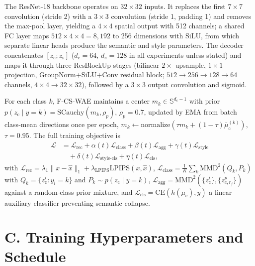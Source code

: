 \documentclass[letterpaper]{article}
\newcommand{\ours}{F-CS-WAE}
\newcommand{\zc}{z_{\mathrm{c}}}
\newcommand{\zs}{z_{\mathrm{s}}}
\newcommand{\muc}{\mu_{\mathrm{c}}}
\newcommand{\Sph}{\mathbb{S}}
\newcommand{\MMD}{\mathrm{MMD}}
\newcommand{\CE}{\mathrm{CE}}
\newcommand{\SCauchy}{\mathrm{SCauchy}}
\begin{document}
The ResNet-18 backbone operates on $32\times32$ inputs. It replaces the first $7\times7$
convolution (stride 2) with a $3\times3$ convolution (stride 1, padding 1)
and removes the max-pool layer, yielding a $4\times4$ spatial output with 512
channels; a shared FC layer maps $512\times4\times4{=}8{,}192$ to 256
dimensions with SiLU, from which separate linear heads produce the semantic
and style parameters. The decoder concatenates $[\zc;\zs]$ ($d_c{=}64$,
$d_s{=}128$ in all experiments unless stated) and maps it through three
ResBlockUp stages (bilinear $2\times$ upsample, $1\times1$ projection,
GroupNorm+SiLU+Conv residual block; $512{\to}256{\to}128{\to}64$ channels,
$4\times4\to32\times32$), followed by a $3\times3$ output convolution and
sigmoid.

For each class $k$, \ours{} maintains a center $m_k\in\Sph^{d_c-1}$ with
prior $p(\zc\mid y{=}k)=\SCauchy(m_k,\rho_p)$, $\rho_p{=}0.7$, updated by EMA
from batch class-mean directions once per epoch,
$m_k\leftarrow\mathrm{normalize}(\tau m_k+(1-\tau)\bar\muc^{(k)})$,
$\tau{=}0.95$. The full training objective is
\begin{align*}
  \mathcal{L} &= \mathcal{L}_{\mathrm{rec}} + \alpha(t)\mathcal{L}_{\mathrm{class}}
   + \beta(t)\mathcal{L}_{\mathrm{agg}} + \gamma(t)\mathcal{L}_{\mathrm{style}}\\
  &\quad + \delta(t)\mathcal{L}_{\mathrm{style\text{-}cls}} + \eta(t)\mathcal{L}_{\mathrm{cls}},
\end{align*}
with
$\mathcal{L}_{\mathrm{rec}}=\lambda_1\|x-\hat x\|_1+\lambda_{\mathrm{LPIPS}}\mathrm{LPIPS}(x,\hat x)$,
$\mathcal{L}_{\mathrm{class}}=\frac1K\sum_k\MMD^2(Q_k,P_k)$ with
$Q_k=\{\zc^i{:}y_i{=}k\}$ and $P_k\sim p(\zc\mid y{=}k)$,
$\mathcal{L}_{\mathrm{agg}}=\MMD^2(\{\zc^i\},\{z_{c,r_j}^p\})$ against a
random-class prior mixture, and $\mathcal{L}_{\mathrm{cls}}=\CE(h(\muc),y)$ a
linear auxiliary classifier preventing semantic collapse.

\section{C. Training Hyperparameters and Schedule}
\end{document}
